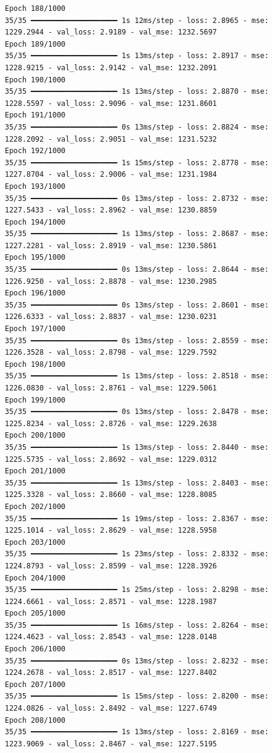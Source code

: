 \documentclass[
  letterpaper,
  DIV=11,
  numbers=noendperiod]{scrreprt}
\begin{document}
\begin{verbatim}
Epoch 188/1000
35/35 ━━━━━━━━━━━━━━━━━━━━ 1s 12ms/step - loss: 2.8965 - mse: 1229.2944 - val_loss: 2.9189 - val_mse: 1232.5697
Epoch 189/1000
35/35 ━━━━━━━━━━━━━━━━━━━━ 1s 13ms/step - loss: 2.8917 - mse: 1228.9215 - val_loss: 2.9142 - val_mse: 1232.2091
Epoch 190/1000
35/35 ━━━━━━━━━━━━━━━━━━━━ 1s 13ms/step - loss: 2.8870 - mse: 1228.5597 - val_loss: 2.9096 - val_mse: 1231.8601
Epoch 191/1000
35/35 ━━━━━━━━━━━━━━━━━━━━ 0s 13ms/step - loss: 2.8824 - mse: 1228.2092 - val_loss: 2.9051 - val_mse: 1231.5232
Epoch 192/1000
35/35 ━━━━━━━━━━━━━━━━━━━━ 1s 15ms/step - loss: 2.8778 - mse: 1227.8704 - val_loss: 2.9006 - val_mse: 1231.1984
Epoch 193/1000
35/35 ━━━━━━━━━━━━━━━━━━━━ 0s 13ms/step - loss: 2.8732 - mse: 1227.5433 - val_loss: 2.8962 - val_mse: 1230.8859
Epoch 194/1000
35/35 ━━━━━━━━━━━━━━━━━━━━ 1s 13ms/step - loss: 2.8687 - mse: 1227.2281 - val_loss: 2.8919 - val_mse: 1230.5861
Epoch 195/1000
35/35 ━━━━━━━━━━━━━━━━━━━━ 0s 13ms/step - loss: 2.8644 - mse: 1226.9250 - val_loss: 2.8878 - val_mse: 1230.2985
Epoch 196/1000
35/35 ━━━━━━━━━━━━━━━━━━━━ 0s 13ms/step - loss: 2.8601 - mse: 1226.6333 - val_loss: 2.8837 - val_mse: 1230.0231
Epoch 197/1000
35/35 ━━━━━━━━━━━━━━━━━━━━ 0s 13ms/step - loss: 2.8559 - mse: 1226.3528 - val_loss: 2.8798 - val_mse: 1229.7592
Epoch 198/1000
35/35 ━━━━━━━━━━━━━━━━━━━━ 1s 13ms/step - loss: 2.8518 - mse: 1226.0830 - val_loss: 2.8761 - val_mse: 1229.5061
Epoch 199/1000
35/35 ━━━━━━━━━━━━━━━━━━━━ 0s 13ms/step - loss: 2.8478 - mse: 1225.8234 - val_loss: 2.8726 - val_mse: 1229.2638
Epoch 200/1000
35/35 ━━━━━━━━━━━━━━━━━━━━ 1s 13ms/step - loss: 2.8440 - mse: 1225.5735 - val_loss: 2.8692 - val_mse: 1229.0312
Epoch 201/1000
35/35 ━━━━━━━━━━━━━━━━━━━━ 1s 13ms/step - loss: 2.8403 - mse: 1225.3328 - val_loss: 2.8660 - val_mse: 1228.8085
Epoch 202/1000
35/35 ━━━━━━━━━━━━━━━━━━━━ 1s 19ms/step - loss: 2.8367 - mse: 1225.1014 - val_loss: 2.8629 - val_mse: 1228.5958
Epoch 203/1000
35/35 ━━━━━━━━━━━━━━━━━━━━ 1s 23ms/step - loss: 2.8332 - mse: 1224.8793 - val_loss: 2.8599 - val_mse: 1228.3926
Epoch 204/1000
35/35 ━━━━━━━━━━━━━━━━━━━━ 1s 25ms/step - loss: 2.8298 - mse: 1224.6661 - val_loss: 2.8571 - val_mse: 1228.1987
Epoch 205/1000
35/35 ━━━━━━━━━━━━━━━━━━━━ 1s 16ms/step - loss: 2.8264 - mse: 1224.4623 - val_loss: 2.8543 - val_mse: 1228.0148
Epoch 206/1000
35/35 ━━━━━━━━━━━━━━━━━━━━ 0s 13ms/step - loss: 2.8232 - mse: 1224.2678 - val_loss: 2.8517 - val_mse: 1227.8402
Epoch 207/1000
35/35 ━━━━━━━━━━━━━━━━━━━━ 1s 15ms/step - loss: 2.8200 - mse: 1224.0826 - val_loss: 2.8492 - val_mse: 1227.6749
Epoch 208/1000
35/35 ━━━━━━━━━━━━━━━━━━━━ 1s 13ms/step - loss: 2.8169 - mse: 1223.9069 - val_loss: 2.8467 - val_mse: 1227.5195

\end{verbatim}
\end{document}
